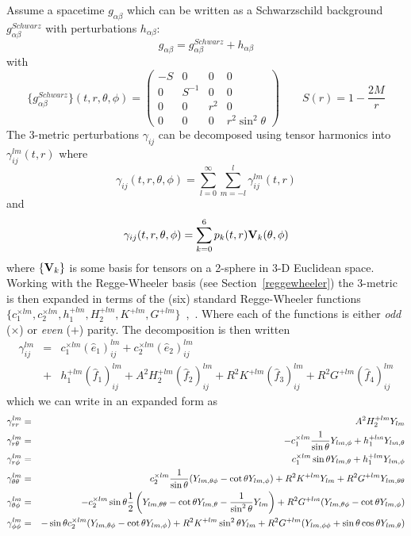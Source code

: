\documentclass{article}
\begin{document}
Assume a spacetime $g_{\alpha\beta}$ which can be written as a Schwarzschild 
background $g_{\alpha\beta}^{Schwarz}$ with perturbations $h_{\alpha\beta}$:
%
\begin{equation}
g_{\alpha\beta} = g^{Schwarz}_{\alpha\beta} + h_{\alpha\beta}
\end{equation}
with
%
\begin{equation}
\{g^{Schwarz}_{\alpha\beta}\}(t,r,\theta,\phi) = 
\left( \begin{array}{cccc}
 -S & 0      & 0   & 0                \\
 0  & S^{-1} & 0   & 0                \\
 0  & 0      & r^2 & 0                \\
 0  & 0      & 0   & r^2 \sin^2\theta
\end{array}\right)
\qquad
S(r)=1-\frac{2M}{r}
\end{equation}
%
The 3-metric perturbations $\gamma_{ij}$ can be decomposed using tensor
harmonics into  $\gamma_{ij}^{lm}(t,r)$ where
$$
  \gamma_{ij}(t,r,\theta,\phi)=\sum_{l=0}^\infty \sum_{m=-l}^l
                       \gamma_{ij}^{lm}(t,r)
$$
%
and
%
$$
  \gamma_{ij}(t,r,\theta,\phi) = \sum_{k=0}^6 p_k(t,r) {\bf V}_k(\theta,\phi)
$$
where $\{{\bf V}_k\}$ is some basis for tensors on a 2-sphere
in 3-D Euclidean space.
%
%
%
Working with the Regge-Wheeler basis (see Section~\ref{reggewheeler})
the 3-metric is then expanded in terms of the (six) standard
Regge-Wheeler functions $\{c_1^{\times lm}, c_2^{\times lm},
h_1^{+lm}, H_2^{+lm}, K^{+lm},
G^{+lm}\}$~\cite{regge},~\cite{moncrief74}. Where each of the
functions is either {\it odd} ($\times$) or {\it even} ($+$)
parity. The decomposition is then written
%
\begin{eqnarray}
\gamma_{ij}^{lm} & = & c_1^{\times lm}(\hat{e}_1)_{ij}^{lm}
                   +   c_2^{\times lm}(\hat{e}_2)_{ij}^{lm} 
\nonumber\\
                 & + & h_1^{+lm}(\hat{f}_1)_{ij}^{lm} 
                   +   A^2 H_2^{+lm}(\hat{f}_2)_{ij}^{lm}
                   +   R^2 K^{+lm}(\hat{f}_3)_{ij}^{lm}
                   +   R^2 G^{+lm}(\hat{f}_4)_{ij}^{lm}
\end{eqnarray}
%
which we can write in an expanded form as 
%
\begin{eqnarray}
\gamma_{rr}^{lm} 
  & = & A^2 H_2^{+lm} Y_{lm} 
\\
\gamma_{r\theta}^{lm} 
  & = & - c_1^{\times lm} \frac{1}{\sin\theta} Y_{lm,\phi}+h_1^{+lm}Y_{lm,\theta} 
\\
\gamma_{r\phi}^{lm} 
  & = & c_1^{\times lm} \sin\theta Y_{lm,\theta}+ h_1^{+lm}Y_{lm,\phi} 
\\
\gamma_{\theta\theta}^{lm} 
  & = & c_2^{\times lm}\frac{1}{\sin\theta}(Y_{lm,\theta\phi}-\cot\theta Y_{lm,\phi}) 
      + R^2 K^{+lm}Y_{lm} + R^2 G^{+lm}    Y_{lm,\theta\theta} 
\\
\gamma_{\theta\phi}^{lm} 
  & = & -c_2^{\times lm}\sin\theta \frac{1}{2} 
  \left(
  Y_{lm,\theta\theta}-\cot\theta Y_{lm,\theta}-\frac{1}{\sin^2\theta}Y_{lm} \right)
  + R^2 G^{+lm}(Y_{lm,\theta\phi}-\cot\theta Y_{lm,\phi})
\\
\gamma_{\phi\phi}^{lm}
  & = &  -\sin\theta c_2^{\times lm} (Y_{lm,\theta\phi} - \cot\theta Y_{lm,\phi})
        +R^2 K^{+lm}\sin^2\theta Y_{lm}
        +R^2 G^{+lm} (Y_{lm,\phi\phi}+\sin\theta\cos\theta Y_{lm,\theta})
\end{eqnarray}
\end{document}
